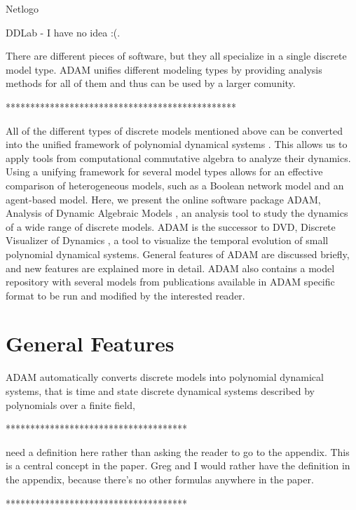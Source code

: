 \documentclass[11pt]{amsart}
\begin{document}
Netlogo
 
DDLab - I have no idea :(. 
 
 
There are different pieces of software, but they all specialize in a single discrete model type. ADAM unifies different  modeling types by providing analysis methods for all of them and thus can be used by a larger comunity. 
 
***********************************************
 
All of the different types of discrete models mentioned above can be
converted into the unified framework of polynomial dynamical systems
\cite{Alan:Bioinf2010, Hinkelmann:2010}. This allows us to apply tools from
computational commutative algebra to analyze their dynamics. Using a unifying framework for several model types
allows for an effective comparison of heterogeneous models, such as a Boolean network model and an agent-based model.
Here, we present the online software package ADAM, Analysis of Dynamic Algebraic Models \cite{ADAM}, an analysis tool to study the dynamics of a wide range of discrete models. ADAM is the successor to DVD, Discrete Visualizer of Dynamics \cite{DVD}, a tool to visualize the temporal evolution of small polynomial dynamical systems.
General features of ADAM are discussed briefly, and new features are explained more in detail. ADAM also contains a model repository with several models from publications available in ADAM specific format to be run and modified by the interested reader.
 
\section{General Features}
ADAM automatically converts discrete models into polynomial dynamical
systems, that is time and state discrete dynamical systems described by polynomials over a finite field,
 
*************************************
 
need a definition here rather than asking the reader to go to the appendix. This is a central
concept in the paper. Greg and I would rather have the definition in the appendix, because there’s no other formulas anywhere in the paper. 
 
*************************************
 
\end{document}
